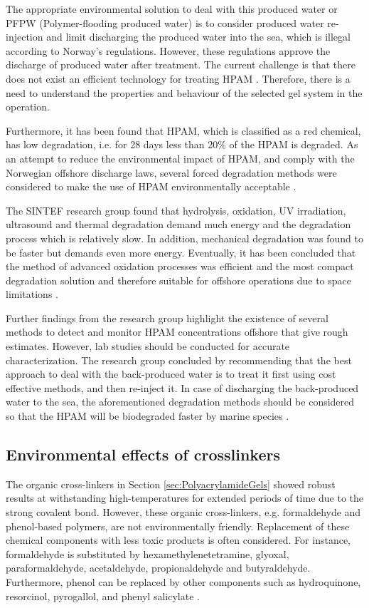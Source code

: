 The appropriate environmental solution to deal with this produced water or PFPW (Polymer-flooding produced water) is to consider produced water re-injection and limit discharging the produced water into the sea, which is illegal according to Norway’s regulations. However, these regulations approve the discharge of produced water after treatment. The current challenge is that there does not exist an efficient technology for treating HPAM \citep{Azrague2011}. Therefore, there is a need to understand the properties and behaviour of the selected gel system in the operation.

Furthermore, it has been found that HPAM, which is classified as a red chemical, has low degradation, i.e. for 28 days less than 20\% of the HPAM is degraded. As an attempt to reduce the environmental impact of HPAM, and comply with the Norwegian offshore discharge laws, several forced degradation methods were considered to make the use of HPAM environmentally acceptable \citep{Azrague2011}. 

The SINTEF research group found that hydrolysis, oxidation, UV irradiation, ultrasound and thermal degradation demand much energy and the degradation process which is relatively slow. In addition, mechanical degradation was found to be faster but demands even more energy. Eventually, it has been concluded that the method of advanced oxidation processes was efficient and the most compact degradation solution and therefore suitable for offshore operations due to space limitations \citep{Azrague2011}.

Further findings from the research group highlight the existence of several methods to detect and monitor HPAM concentrations offshore that give rough estimates. However, lab studies should be conducted for accurate characterization. The research group concluded by recommending that the best approach to deal with the back-produced water is to treat it first using cost effective methods, and then re-inject it. In case of discharging the back-produced water to the sea, the aforementioned degradation methods should be considered so that the HPAM will be biodegraded faster by marine species \citep{Azrague2011}.

\subsection{Environmental effects of crosslinkers}

 The organic cross-linkers  in Section \ref{sec:PolyacrylamideGels} showed robust results at withstanding high-temperatures for extended periods of time due to the strong covalent bond. However, these organic cross-linkers, e.g. formaldehyde and phenol-based polymers, are not environmentally friendly. Replacement of these chemical components with less toxic products is often considered. For instance, formaldehyde is substituted by hexamethylenetetramine, glyoxal, paraformaldehyde, acetaldehyde, propionaldehyde and butyraldehyde. Furthermore, phenol can be replaced by other components such as hydroquinone, resorcinol, pyrogallol, and phenyl salicylate \citep{SinghYadav2013}.

